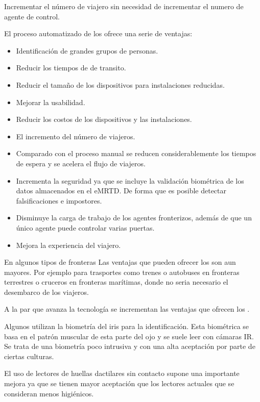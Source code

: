 Incrementar el número de viajero sin necesidad de incrementar el numero de agente de control.

El proceso automatizado de los  ofrece una serie de ventajas:

\begin{itemize}
     \item
     Identificación de grandes grupos de personas.
      \item
      Reducir los tiempos de de transito.
      \item
      Reducir el tamaño de los dispositivos para instalaciones reducidas.
      \item
      Mejorar la \gls{usabilidad}.
      \item
      Reducir los costos de los dispositivos y las instalaciones.
      \item
      El incremento del número de viajeros.
\end{itemize}

\begin{itemize}
    \item 
    Comparado con el proceso manual se reducen considerablemente los tiempos de espera y se acelera el flujo de viajeros.
    \item 
    Incrementa la seguridad ya que se incluye la validación biométrica de los datos almacenados en el \gls{eMRTD}. De forma que es posible detectar falsificaciones e impostores.
    \item
    Disminuye la carga de trabajo de los agentes fronterizos, además de que un único agente puede controlar varias puertas.
    \item
    Mejora la experiencia del viajero.
\end{itemize}

En algunos tipos de fronteras Las ventajas que pueden ofrecer los  son aun mayores. Por ejemplo para trasportes como trenes o autobuses en fronteras terrestres o cruceros en fronteras marítimas, donde no seria necesario el desembarco de los viajeros.

A la par que avanza la tecnología se incrementan las ventajas que ofrecen los .

Algunos  utilizan la biometría del \gls{iris} para la identificación. Esta biométrica se basa en el patrón muscular de esta parte del ojo y se suele leer con cámaras \gls{IR}. Se trata de una biometría poco intrusiva y con una alta aceptación por parte de ciertas culturas.

El uso de lectores de huellas dactilares sin contacto supone una importante mejora ya que se tienen mayor aceptación que los lectores actuales que se consideran menos higiénicos.


